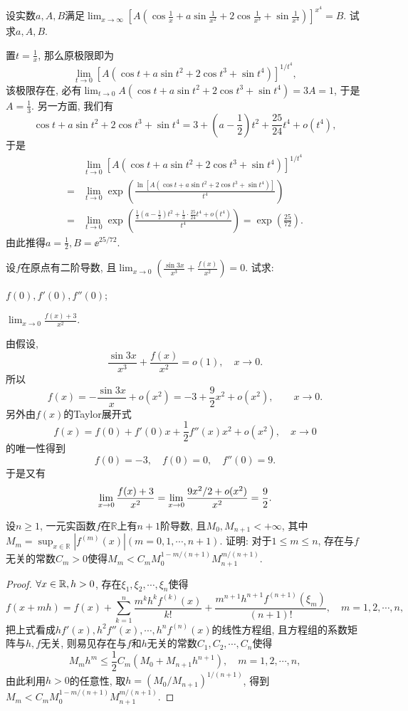 \begin{quiza}
\begin{solution}
\end{solution}
\woe 设实数\(a,A,B\)满足\(\lim_{x\rightarrow\infty}\left[A\left(\cos\frac{1}{x}+a\sin\frac{1}{x^2}+2\cos\frac{1}{x^3}+\sin\frac{1}{x^4}\right)\right]^{x^4}=B\). 试求\(a,A,B\).
\begin{solution}
置\(t=\frac{1}{x}\), 那么原极限即为\[\lim_{t\rightarrow 0}\left[A\left(\cos t+a\sin t^2+2\cos t^3+\sin t^4\right)\right]^{1/t^4},\]该极限存在, 必有\(\lim_{t\rightarrow 0}A\left(\cos t+a\sin t^2+2\cos t^3+\sin t^4\right)=3A=1\), 于是\(A=\frac{1}{3}.\) 另一方面, 我们有\[\cos t+a\sin t^2+2\cos t^3+\sin t^4=3+\left(a-\frac{1}{2}\right)t^2+\frac{25}{24}t^4+o(t^4),\]于是
\[\begin{split}
&\lim_{t\rightarrow 0}\left[A\left(\cos t+a\sin t^2+2\cos t^3+\sin t^4\right)\right]^{1/t^4}\\=&\lim_{t\rightarrow 0}\exp\left(\frac{\ln \left[A\left(\cos t+a\sin t^2+2\cos t^3+\sin t^4\right)\right]}{t^4}\right)\\=&\lim_{t\rightarrow 0}\exp\left(\frac{\displaystyle\frac{1}{3}\left(a-\frac{1}{2}\right)t^2+\frac{1}{3}\cdot\frac{25}{24}t^4+o(t^4)}{t^4}\right)=\exp\left(\frac{25}{72}\right).
\end{split}\]
由此推得\(a=\frac{1}{2},B=\ee^{25/72}.\)
\end{solution}
\woe 设\(f\)在原点有二阶导数, 且\(\lim_{x\rightarrow 0}\left(\frac{\sin 3x}{x^3}+\frac{f(x)}{x^2}\right)=0\). 试求:\begin{quizs}
\item \(f(0),f'(0),f''(0)\);
\item \(\lim_{x\rightarrow 0}\frac{f(x)+3}{x^2}\).
\end{quizs}
\begin{solution}
由假设,\[\frac{\sin3x}{x^3}+\frac{f(x)}{x^2}=o(1),\quad x\rightarrow 0.\]所以\[f(x)=-\frac{\sin 3x}{x}+o(x^2)=-3+\frac{9}{2}x^2+o(x^2),\qquad x\rightarrow 0.\]另外由\(f(x)\)的Taylor展开式\[f(x)=f(0)+f'(0)x+\frac{1}{2}f''(x)x^2+o(x^2),\quad x\rightarrow 0\]的唯一性得到\[f(0)=-3,\quad f(0)=0,\quad f''(0)=9.\]
于是又有\[\lim_{x\rightarrow 0}\frac{f(x)+3}{x^2}=\lim_{x\rightarrow 0}\frac{9x^2/2+o(x^2)}{x^2}=\frac{9}{2}.\qedhere\]
\end{solution}
\woe 设\(n\geqslant 1\), 一元实函数\(f\)在\(\mathbb{R}\)上有\(n+1\)阶导数, 且\(M_0,M_{n+1}<+\infty\), 其中\(M_m=\sup_{x\in\mathbb{R}}|f^{(m)}(x)|(m=0,1,\cdots,n+1)\). 证明: 对于\(1\leqslant m\leqslant n\), 存在与\(f\)无关的常数\(C_m>0\)使得\(M_m<C_mM_0^{1-m/(n+1)}M_{n+1}^{m/(n+1)}\).
\begin{proof}
\(\forall x\in\mathbb{R},h>0\), 存在\(\xi_1,\xi_2,\cdots,\xi_n\)使得\[f(x+mh)=f(x)+\sum_{k=1}^{n}\frac{m^kh^kf^{(k)}(x)}{k!}+\frac{m^{n+1}h^{n+1}f^{(n+1)}(\xi_m)}{(n+1)!},\quad m=1,2,\cdots,n,\]把上式看成\(hf'(x),h^2f''(x),\cdots,h^nf^{(n)}(x)\)的线性方程组, 且方程组的系数矩阵与\(h,f\)无关,  则易见存在与\(f\)和\(h\)无关的常数\(C_1,C_2,\cdots,C_n\)使得\[M_mh^m\leqslant\frac{1}{2}C_m\left(M_0+M_{n+1}h^{n+1}\right),\quad m=1,2,\cdots,n,\]由此利用\(h>0\)的任意性, 取\(h=\left(M_0/M_{n+1}\right)^{1/(n+1)}\), 得到\(M_m<C_mM_0^{1-m/(n+1)}M_{n+1}^{m/(n+1)}\).

\end{proof}
\end{quiza}
